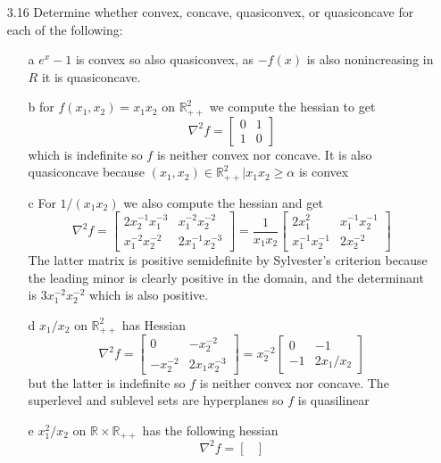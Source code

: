\documentclass[12pt]{article}
\begin{document}
\begin{itemize}
\item[3.16] Determine whether convex, concave, quasiconvex, or quasiconcave for each of the following:
  \begin{itemize}
  \item[a] $e^x - 1$ is convex so also quasiconvex, as $-f(x)$ is also nonincreasing in $R$ it is quasiconcave.
  \item[b] for $f(x_1, x_2) = x_1 x_2$ on $\mathbb{R}_{++}^2$ we compute the hessian to get
    $$
    \nabla^2 f = \begin{bmatrix}
      0 & 1 \\
      1 & 0
      \end{bmatrix}
    $$
    which is indefinite so $f$ is neither convex nor concave. It is also quasiconcave because ${(x_1, x_2) \in \mathbb{R}_{++}^2 | x_1 x_2 \geq \alpha}$ is convex 
  \item[c] For $1 / (x_1 x_2)$ we also compute the hessian and get
    $$
    \nabla^2 f = \begin{bmatrix}
      2 x_2^{-1} x_1^{-3} & x_1^{-2} x_2^{-2} \\
      x_1^{-2} x_2^{-2} & 2 x_1^{-1} x_2^{-3}
      \end{bmatrix} = \frac{1}{x_1 x_2} \begin{bmatrix}
      2 x_1^2 & x_1^{-1}x_2^{-1} \\
      x_1^{-1}x_2^{-1} & 2 x_2^{-2}
      \end{bmatrix}
      $$
      The latter matrix is positive semidefinite by Sylvester's criterion because the leading minor is clearly positive in the domain, and the determinant is $3 x_1^{-2} x_2^{-2}$ which is also positive. 
    \item[d] $x_1 / x_2$ on $\mathbb{R}_{++}^2$ has Hessian
      $$
      \nabla^2 f = \begin{bmatrix}
        0 & -x_2^{-2} \\
        -x_2^{-2} & 2 x_1 x_2^{-3}
      \end{bmatrix} = x_2^{-2} \begin{bmatrix}
        0 & -1 \\
        -1 & 2 x_1 / x_2
      \end{bmatrix}
      $$
      but the latter is indefinite so $f$ is neither convex nor concave. The superlevel and sublevel sets are hyperplanes so $f$ is quasilinear
    \item[e] $x_1^2 / x_2$ on $\mathbb{R} \times \mathbb{R}_{++}$ has the following hessian
      $$
      \nabla^2 f = \begin{bmatrix}

\end{bmatrix}$$
\end{itemize}
\end{itemize}
\end{document}
